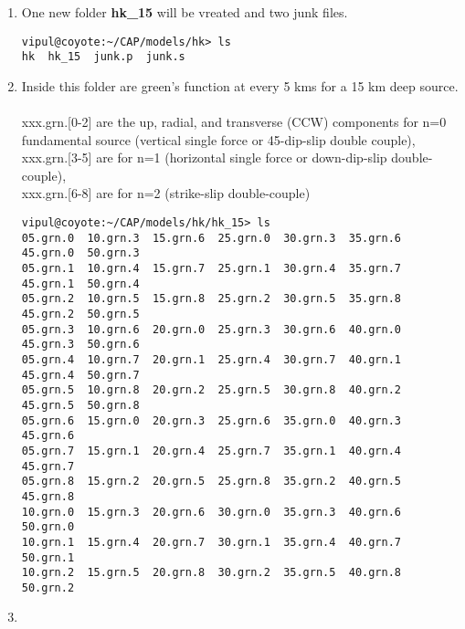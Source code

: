 \documentclass[11pt,titlepage,fleqn]{article}
\begin{document}
\begin{enumerate}
\item One new folder {\bf hk\_15} will be vreated and two junk files.
\begin{verbatim}
vipul@coyote:~/CAP/models/hk> ls
hk  hk_15  junk.p  junk.s
\end{verbatim}

\item Inside this folder are green's function at every 5 kms for a 15 km deep source. \\ \\
xxx.grn.[0-2] are the up, radial, and transverse (CCW) components for n=0 fundamental source (vertical single force or 45-dip-slip double couple),\\
xxx.grn.[3-5] are for n=1 (horizontal single force or down-dip-slip double-couple),\\
xxx.grn.[6-8] are for n=2 (strike-slip double-couple)
\begin{verbatim}
vipul@coyote:~/CAP/models/hk/hk_15> ls
05.grn.0  10.grn.3  15.grn.6  25.grn.0  30.grn.3  35.grn.6  45.grn.0  50.grn.3
05.grn.1  10.grn.4  15.grn.7  25.grn.1  30.grn.4  35.grn.7  45.grn.1  50.grn.4
05.grn.2  10.grn.5  15.grn.8  25.grn.2  30.grn.5  35.grn.8  45.grn.2  50.grn.5
05.grn.3  10.grn.6  20.grn.0  25.grn.3  30.grn.6  40.grn.0  45.grn.3  50.grn.6
05.grn.4  10.grn.7  20.grn.1  25.grn.4  30.grn.7  40.grn.1  45.grn.4  50.grn.7
05.grn.5  10.grn.8  20.grn.2  25.grn.5  30.grn.8  40.grn.2  45.grn.5  50.grn.8
05.grn.6  15.grn.0  20.grn.3  25.grn.6  35.grn.0  40.grn.3  45.grn.6
05.grn.7  15.grn.1  20.grn.4  25.grn.7  35.grn.1  40.grn.4  45.grn.7
05.grn.8  15.grn.2  20.grn.5  25.grn.8  35.grn.2  40.grn.5  45.grn.8
10.grn.0  15.grn.3  20.grn.6  30.grn.0  35.grn.3  40.grn.6  50.grn.0
10.grn.1  15.grn.4  20.grn.7  30.grn.1  35.grn.4  40.grn.7  50.grn.1
10.grn.2  15.grn.5  20.grn.8  30.grn.2  35.grn.5  40.grn.8  50.grn.2
\end{verbatim}

\item

\pagebreak
{}


\end{enumerate}
\end{document}
